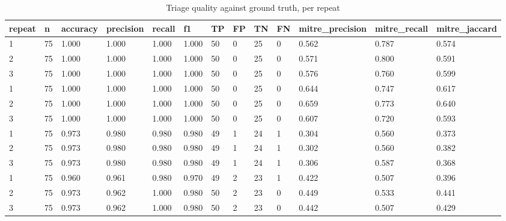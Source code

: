 \begin{table}[!t]
\centering
\caption{Triage quality against ground truth, per repeat}
\label{tab:quality}
\begin{tabular}{lllllllllllll}
\hline
repeat & n & accuracy & precision & recall & f1 & TP & FP & TN & FN & mitre\_precision & mitre\_recall & mitre\_jaccard \\
\hline
1 & 75 & 1.000 & 1.000 & 1.000 & 1.000 & 50 & 0 & 25 & 0 & 0.562 & 0.787 & 0.574 \\
2 & 75 & 1.000 & 1.000 & 1.000 & 1.000 & 50 & 0 & 25 & 0 & 0.571 & 0.800 & 0.591 \\
3 & 75 & 1.000 & 1.000 & 1.000 & 1.000 & 50 & 0 & 25 & 0 & 0.576 & 0.760 & 0.599 \\
1 & 75 & 1.000 & 1.000 & 1.000 & 1.000 & 50 & 0 & 25 & 0 & 0.644 & 0.747 & 0.617 \\
2 & 75 & 1.000 & 1.000 & 1.000 & 1.000 & 50 & 0 & 25 & 0 & 0.659 & 0.773 & 0.640 \\
3 & 75 & 1.000 & 1.000 & 1.000 & 1.000 & 50 & 0 & 25 & 0 & 0.607 & 0.720 & 0.593 \\
1 & 75 & 0.973 & 0.980 & 0.980 & 0.980 & 49 & 1 & 24 & 1 & 0.304 & 0.560 & 0.373 \\
2 & 75 & 0.973 & 0.980 & 0.980 & 0.980 & 49 & 1 & 24 & 1 & 0.302 & 0.560 & 0.382 \\
3 & 75 & 0.973 & 0.980 & 0.980 & 0.980 & 49 & 1 & 24 & 1 & 0.306 & 0.587 & 0.368 \\
1 & 75 & 0.960 & 0.961 & 0.980 & 0.970 & 49 & 2 & 23 & 1 & 0.422 & 0.507 & 0.396 \\
2 & 75 & 0.973 & 0.962 & 1.000 & 0.980 & 50 & 2 & 23 & 0 & 0.449 & 0.533 & 0.441 \\
3 & 75 & 0.973 & 0.962 & 1.000 & 0.980 & 50 & 2 & 23 & 0 & 0.442 & 0.507 & 0.429 \\
\hline
\end{tabular}
\end{table}

